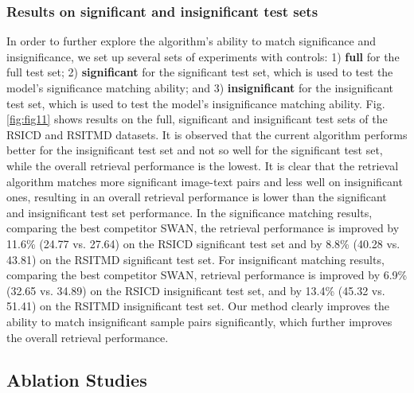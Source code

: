\documentclass[journal]{IEEEtran}
\begin{document}
\subsubsection{Results on significant and insignificant test sets}
In order to further explore the algorithm's ability to match significance and insignificance, we set up several sets of experiments with controls: 1) \textbf{full} for the full test set; 2) \textbf{significant} for the significant test set, which is used to test the model's significance matching ability; and 3) \textbf{insignificant} for the insignificant test set, which is used to test the model's insignificance matching ability. Fig. \ref{fig:fig11} shows results on the full, significant and insignificant test sets of the RSICD and RSITMD datasets. It is observed that the current algorithm performs better for the insignificant test set and not so well for the significant test set, while the overall retrieval performance is the lowest. It is clear that the retrieval algorithm matches more significant image-text pairs and less well on insignificant ones, resulting in an overall retrieval performance is lower than the significant and insignificant test set performance. In the significance matching results, comparing the best competitor SWAN, the retrieval performance is improved by 11.6\% (24.77 vs. 27.64) on the RSICD significant test set and by 8.8\% (40.28 vs. 43.81) on the RSITMD significant test set. For insignificant matching results, comparing the best competitor SWAN, retrieval performance is improved by 6.9\% (32.65 vs. 34.89) on the RSICD insignificant test set, and by 13.4\% (45.32 vs. 51.41) on the RSITMD insignificant test set. Our method clearly improves the ability to match insignificant sample pairs significantly, which further improves the overall retrieval performance.

\subsection{Ablation Studies}
\end{document}
